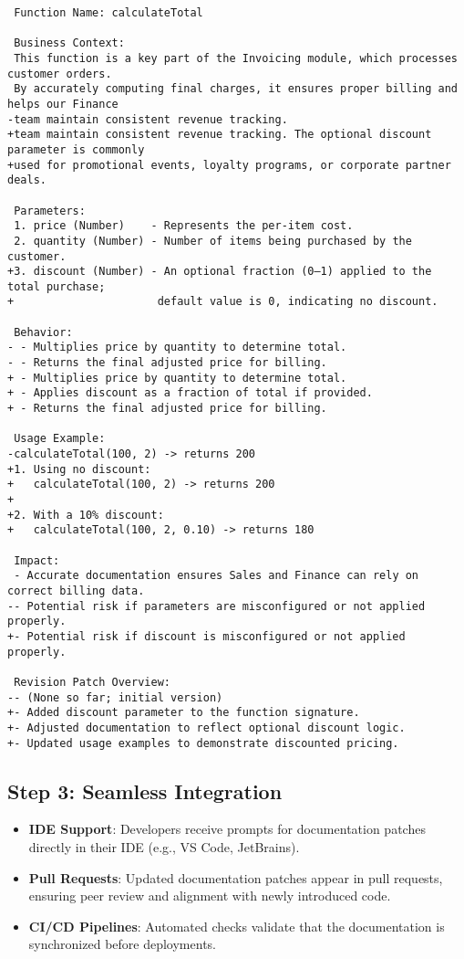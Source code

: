 \documentclass[12pt,oneside]{article}
\begin{document}
\begin{verbatim}
 Function Name: calculateTotal

 Business Context:
 This function is a key part of the Invoicing module, which processes customer orders.
 By accurately computing final charges, it ensures proper billing and helps our Finance
-team maintain consistent revenue tracking.
+team maintain consistent revenue tracking. The optional discount parameter is commonly
+used for promotional events, loyalty programs, or corporate partner deals.

 Parameters:
 1. price (Number)    - Represents the per-item cost.
 2. quantity (Number) - Number of items being purchased by the customer.
+3. discount (Number) - An optional fraction (0–1) applied to the total purchase;
+                      default value is 0, indicating no discount.

 Behavior:
- - Multiplies price by quantity to determine total.
- - Returns the final adjusted price for billing.
+ - Multiplies price by quantity to determine total.
+ - Applies discount as a fraction of total if provided.
+ - Returns the final adjusted price for billing.

 Usage Example:
-calculateTotal(100, 2) -> returns 200
+1. Using no discount:
+   calculateTotal(100, 2) -> returns 200
+
+2. With a 10% discount:
+   calculateTotal(100, 2, 0.10) -> returns 180

 Impact:
 - Accurate documentation ensures Sales and Finance can rely on correct billing data.
-- Potential risk if parameters are misconfigured or not applied properly.
+- Potential risk if discount is misconfigured or not applied properly.

 Revision Patch Overview:
-- (None so far; initial version)
+- Added discount parameter to the function signature.
+- Adjusted documentation to reflect optional discount logic.
+- Updated usage examples to demonstrate discounted pricing.
\end{verbatim}

\subsection{Step 3: Seamless Integration}
\begin{itemize}
  \item \textbf{IDE Support}: Developers receive prompts for documentation patches directly in their IDE (e.g., VS Code, JetBrains).
  \item \textbf{Pull Requests}: Updated documentation patches appear in pull requests, ensuring peer review and alignment with newly introduced code.
  \item \textbf{CI/CD Pipelines}: Automated checks validate that the documentation is synchronized before deployments.
\end{itemize}
\end{document}
